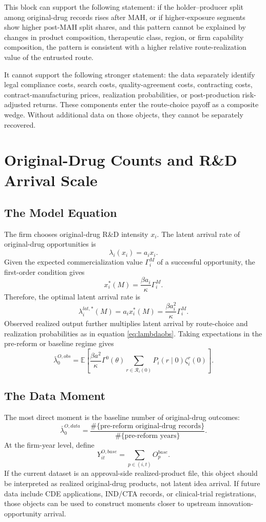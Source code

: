 \documentclass[12pt]{article}
\newcommand{\E}{\mathbb{E}}
\newcommand{\1}{\mathbf{1}}
\newcommand{\calR}{\mathcal{R}}
\begin{document}
This block can support the following statement: if the holder--producer split among original-drug records rises after MAH, or if higher-exposure segments show higher post-MAH split shares, and this pattern cannot be explained by changes in product composition, therapeutic class, region, or firm capability composition, the pattern is consistent with a higher relative route-realization value of the entrusted route.

It cannot support the following stronger statement: the data separately identify legal compliance costs, search costs, quality-agreement costs, contracting costs, contract-manufacturing prices, realization probabilities, or post-production risk-adjusted returns. These components enter the route-choice payoff as a composite wedge. Without additional data on those objects, they cannot be separately recovered.

\section{Original-Drug Counts and R\&D Arrival Scale}

\subsection{The Model Equation}

The firm chooses original-drug R\&D intensity $x_i$. The latent arrival rate of original-drug opportunities is
\[
    \lambda_i(x_i)=a_i x_i.
\]
Given the expected commercialization value $\Gamma_i^M$ of a successful opportunity, the first-order condition gives
\[
    x_i^*(M)=\frac{\beta a_i}{\kappa}\Gamma_i^M.
\]
Therefore, the optimal latent arrival rate is
\[
    \lambda_i^{lat,*}(M)=a_i x_i^*(M)
    =
    \frac{\beta a_i^2}{\kappa}\Gamma_i^M.
\]
Observed realized output further multiplies latent arrival by route-choice and realization probabilities as in equation \eqref{eq:lambdaobs}.
Taking expectations in the pre-reform or baseline regime gives
\[
    \bar\lambda_0^{O,obs}
    =
    \E\left[
    \frac{\beta a^2}{\kappa}\Gamma^0(\theta)
    \sum_{r\in\calR_i(0)}P_i(r\mid0)\zeta_i^r(0)
    \right].
\]

\subsection{The Data Moment}

The most direct moment is the baseline number of original-drug outcomes:
\[
    \bar\lambda_0^{O,data}
    =
    \frac{\#\{\text{pre-reform original-drug records}\}}
    {\#\{\text{pre-reform years}\}}.
\]
At the firm-year level, define
\[
    Y_{it}^{O,base}=\sum_{p\in(i,t)}O_p^{base}.
\]
If the current dataset is an approval-side realized-product file, this object should be interpreted as realized original-drug products, not latent idea arrival. If future data include CDE applications, IND/CTA records, or clinical-trial registrations, those objects can be used to construct moments closer to upstream innovation-opportunity arrival.
\end{document}
